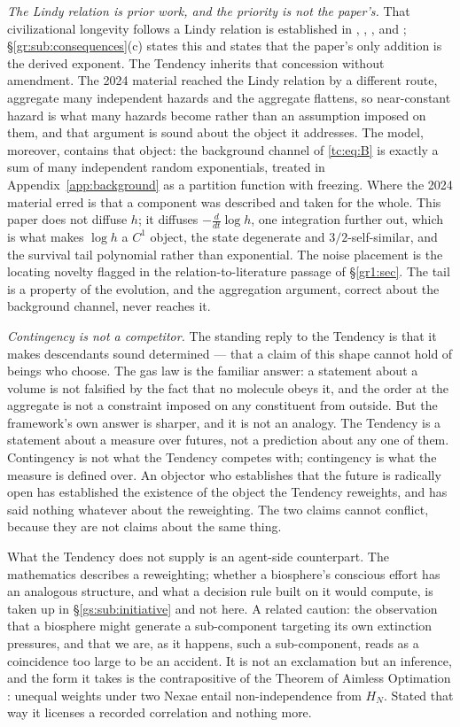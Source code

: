 \documentclass[11pt]{article}
\numberwithin{equation}{section}
\theoremstyle{plain}
\theoremstyle{definition}
\theoremstyle{remark}
\begin{document}
\emph{The Lindy relation is prior work, and the priority is not the paper's.} That civilizational longevity follows a Lindy relation is established in \cite{BC21}, \cite{BG24}, \cite{Kip20}, and \cite{Ord23}; \S\ref{gr:sub:consequences}(c) states this and states that the paper's only addition is the derived exponent. The Tendency inherits that concession without amendment. The 2024 material reached the Lindy relation by a different route, aggregate many independent hazards and the aggregate flattens, so near-constant hazard is what many hazards become rather than an assumption imposed on them, and that argument is sound about the object it addresses. The model, moreover, contains that object: the background channel of \eqref{tc:eq:B} is exactly a sum of many independent random exponentials, treated in Appendix~\ref{app:background} as a partition function with freezing. Where the 2024 material erred is that a component was described and taken for the whole. This paper does not diffuse $h$; it diffuses $-\tfrac{d}{dt}\log h$, one integration further out, which is what makes $\log h$ a $C^1$ object, the state degenerate and $3/2$-self-similar, and the survival tail polynomial rather than exponential. The noise placement is the locating novelty flagged in the relation-to-literature passage of \S\ref{gr1:sec}. The tail is a property of the evolution, and the aggregation argument, correct about the background channel, never reaches it.

\emph{Contingency is not a competitor.} The standing reply to the Tendency is that it makes descendants sound determined --- that a claim of this shape cannot hold of beings who choose. The gas law is the familiar answer: a statement about a volume is not falsified by the fact that no molecule obeys it, and the order at the aggregate is not a constraint imposed on any constituent from outside. But the framework's own answer is sharper, and it is not an analogy. The Tendency is a statement about a measure over futures, not a prediction about any one of them. Contingency is not what the Tendency competes with; contingency is what the measure is defined over. An objector who establishes that the future is radically open has established the existence of the object the Tendency reweights, and has said nothing whatever about the reweighting. The two claims cannot conflict, because they are not claims about the same thing.

What the Tendency does not supply is an agent-side counterpart. The mathematics describes a reweighting; whether a biosphere's conscious effort has an analogous structure, and what a decision rule built on it would compute, is taken up in \S\ref{gs:sub:initiative} and not here. A related caution: the observation that a biosphere might generate a sub-component targeting its own extinction pressures, and that we are, as it happens, such a sub-component, reads as a coincidence too large to be an accident. It is not an exclamation but an inference, and the form it takes is the contrapositive of the Theorem of Aimless Optimation \cite{Nexus}: unequal weights under two Nexae entail non-independence from $H_N$. Stated that way it licenses a recorded correlation and nothing more.
\end{document}
